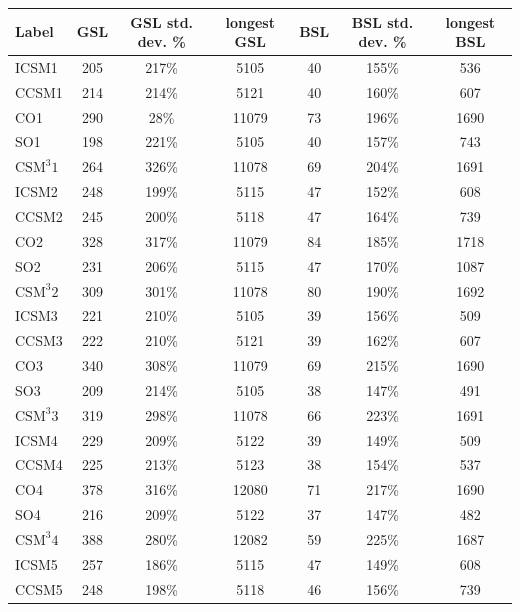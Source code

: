 \begin{table}
  \begin{tabular}{| l | c | c | c | c | c | c |}\hline
    Label & GSL & GSL std. dev. \% & longest GSL & BSL & BSL std. dev. \% & longest BSL  \\\hline
    ICSM1 & 205 & 217\% & 5105 & 40 & 155\% & 536 \\\hline
    CCSM1 & 214 & 214\% & 5121 & 40 & 160\% & 607 \\\hline
    CO1 & 290 & 28\% & 11079 & 73 & 196\% & 1690 \\\hline
    SO1 & 198 & 221\% & 5105 & 40 & 157\% & 743 \\\hline
    $\text{CSM}^{3}1$ & 264 & 326\% & 11078 & 69 & 204\% & 1691 \\\hline\hline
%
    ICSM2 & 248 & 199\% & 5115 & 47 & 152\% & 608 \\\hline
    CCSM2 &245 & 200\% & 5118 & 47 & 164\% & 739 \\\hline
    CO2 & 328 & 317\% & 11079 & 84 & 185\% & 1718 \\\hline
    SO2 & 231 & 206\% & 5115 & 47 & 170\% & 1087 \\\hline
    $\text{CSM}^{3}2$ & 309 & 301\% & 11078 & 80 & 190\% & 1692 \\\hline\hline
%
    ICSM3 & 221 & 210\% & 5105 & 39 & 156\% & 509 \\\hline
    CCSM3 & 222 & 210\% & 5121 & 39 & 162\% & 607 \\\hline
    CO3 & 340 & 308\% & 11079 & 69 & 215\% & 1690 \\\hline
    SO3 & 209 & 214\% & 5105 & 38 & 147\% & 491 \\\hline
    $\text{CSM}^{3}3$ & 319 & 298\% & 11078 & 66 & 223\% & 1691 \\\hline\hline
%
    ICSM4 & 229 & 209\% & 5122 & 39 & 149\% & 509 \\\hline
    CCSM4 & 225 & 213\% & 5123 & 38 & 154\% & 537 \\\hline
    CO4 & 378 & 316\% & 12080 & 71 & 217\% & 1690 \\\hline
    SO4 & 216 & 209\% & 5122 & 37 & 147\% & 482 \\\hline
    $\text{CSM}^{3}4$ & 388 & 280\% & 12082 & 59 & 225\% & 1687 \\\hline\hline
%
    ICSM5 & 257 & 186\% & 5115 & 47 & 149\% & 608 \\\hline
    CCSM5 & 248 & 198\% & 5118 & 46 & 156\% & 739 \\\hline

\end{tabular}
\end{table}
